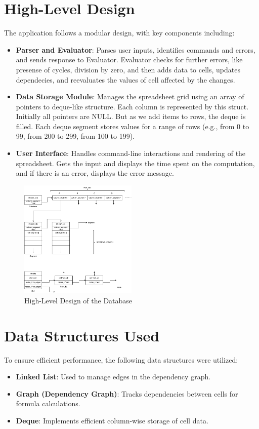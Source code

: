 \documentclass{article}
\begin{document}
\section{High-Level Design}
The application follows a modular design, with key components including:
\begin{itemize}
    \item \textbf{Parser and Evaluator}: Parses user inputs, identifies commands and errors, and sends response to Evaluator. Evaluator checks for further errors, like presense of cycles, division by zero, and then adds data to cells, updates dependecies, and reevaluates the values of cell affected by the changes.
    \item \textbf{Data Storage Module}: Manages the spreadsheet grid using an array of pointers to deque-like structure. Each column is represented by this struct. Initially all pointers are NULL. But as we add items to rows, the deque is filled. Each deque segment stores values for a range of rows (e.g., from 0 to 99, from 200 to 299, from 100 to 199).
    \item \textbf{User Interface}: Handles command-line interactions and rendering of the spreadsheet. Gets the input and displays the time spent on the computation, and if there is an error, displays the error message.
\end{itemize}

\begin{figure}[ht]
    \centering
    \includegraphics[width=0.5\textwidth]{hld.png}
    \caption{High-Level Design of the Database}
    \label{fig:high_level_design}
\end{figure}

\section{Data Structures Used}
To ensure efficient performance, the following data structures were utilized:
\begin{itemize}
    \item \textbf{Linked List}: Used to manage edges in the dependency graph.
    \item \textbf{Graph (Dependency Graph)}: Tracks dependencies between cells for formula calculations.
    \item \textbf{Deque}: Implements efficient column-wise storage of cell data.
\end{itemize}
\end{document}
